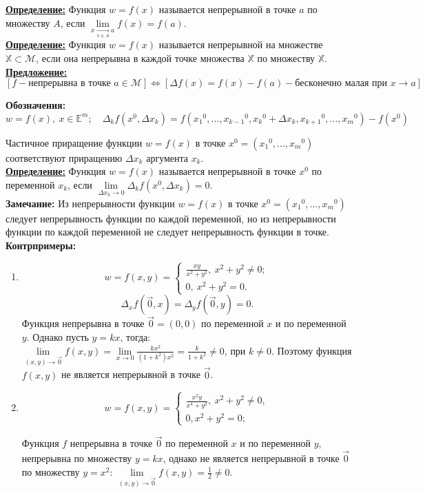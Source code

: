 \documentclass[a4paper,12pt]{article} %
\begin{document}
	\underline{\textbf{Определение:}} Функция $w = f(x)$ называется непрерывной в точке $a$ по
	множеству $A$, если $\lim\limits_{x \xrightarrow[x \in A]{} a}f(x) = f(a)$.\\
	
	\underline{\textbf{Определение:}} Функция $w = f(x)$ называется непрерывной на множестве 
	$\mathbb{X} \subset \mathscr{M}$, если она непрерывна в каждой точке множества 
	$\mathbb{X}$ по множеству $\mathbb{X}$.\\
	
	\underline{\textbf{Предложение:}} 
	\[[f - \text{непрерывна в точке }a \in \mathscr{M}] \Leftrightarrow [\Delta f(x) = f(x) - f(a) - \text{бесконечно малая при } x \to a]\]
	
	\textbf{Обозначения:} 
	\[w = f(x), ~ x \in \mathbb{E}^m; \quad \Delta_kf(x^0, \Delta x_k) = f({x_1}^0, ..., {x_{k-1}}^0, {x_{k}}^0 + \Delta x_k, {x_{k+1}}^0, ..., {x_{m}}^0) - f(x^0)\]
	
	Частичное приращение функции $w = f(x)$ в точке $x^0 = ({x_1}^0, ..., {x_m}^0)$ соответствуют приращению $\Delta x_k$ аргумента $x_k$.\\
	
	\underline{\textbf{Определение:}} Функция $w = f(x)$ называется непрерывной в точке $x^0$ по переменной $x_k$, если $\lim\limits_{\Delta x_k \to 0}\Delta_k f(x^0, \Delta x_k) = 0$.\\
	
	\textbf{Замечание:} Из непрерывности функции $w = f(x)$ в точке $x^0 = ({x_1}^0, ..., {x_m}^0)$ следует непрерывность функции по каждой переменной, но из непрерывности функции по каждой переменной не следует непрерывность функции в точке.\\
	
	\textbf{Контрпримеры:}
	\begin{enumerate}
		\item $$w = f(x, y) = 
		\begin{cases}
			\frac{xy}{x^2 + y^2}, ~ x^2 + y^2 \neq 0;
			\\0, ~ x^2 + y^2 = 0.
		\end{cases}
		$$
		$$\Delta_xf(\vec{0}, x) = \Delta_yf(\vec{0}, y) = 0.$$
		Функция непрерывна в точке $\vec{0} = (0, 0)$ по переменной $x$ и по переменной $y$.
		Однако пусть $y = kx$, тогда:
		\\[3mm]$\lim\limits_{(x, y) \to \vec{0}}f(x, y) = \lim\limits_{x \to 0}\frac{kx^2}{(1 + k^2)x^2} =
		\frac{k}{1+k^2} \neq 0$, при $k \neq 0$. Поэтому функция $f(x, y)$ не является непрерывной в точке $\vec{0}$.
		\item $$w = f(x, y) = 
		\begin{cases}
			\frac{x^2y}{x^4+y^2}, ~x^2 + y^2 \neq 0,
			\\0, x^2 + y^2 = 0;
		\end{cases}
		$$
		
		Функция $f$ непрерывна в точке $\vec{0}$ по переменной $x$ и по переменной $y$, непрерывна по множеству $y = kx$, однако не является непрерывной в точке $\vec{0}$ по множеству $y = x^2$: $\lim\limits_{(x, y) \to \vec{0}}f(x, y) = \frac{1}{2} \neq 0$.
	\end{enumerate}
	
\end{document}
